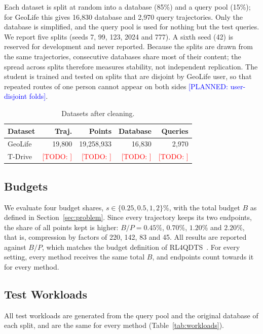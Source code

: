\documentclass[conference]{IEEEtran}
\newcommand{\todo}[1]{\textcolor{red}{[TODO: #1]}}
\newcommand{\planned}[1]{\textcolor{blue}{[PLANNED: #1]}}
\begin{document}
Each dataset is split at random into a database (85\%) and a query pool (15\%); for GeoLife this
gives 16{,}830 database and 2{,}970 query trajectories. Only the database is simplified, and
the query pool is used for nothing but the test queries. We report five splits (seeds 7, 99, 123,
2024 and 777). A sixth seed (42) is reserved for development and never reported. Because the
splits are drawn from the same trajectories, consecutive databases share most of their content;
the spread across splits therefore measures stability, not independent replication. The student is
trained and tested on splits that are disjoint by GeoLife user, so that repeated routes of one
person cannot appear on both sides \planned{user-disjoint folds}.

\begin{table}[t]
\centering
\caption{Datasets after cleaning.}
\label{tab:datasets}
\small
\begin{tabular}{@{}lrrrr@{}}
\toprule
Dataset & Traj. & Points & Database & Queries \\
\midrule
GeoLife & 19{,}800 & 19{,}258{,}933 & 16{,}830 & 2{,}970 \\
T-Drive & \todo{} & \todo{} & \todo{} & \todo{} \\
\bottomrule
\end{tabular}
\end{table}

\subsection{Budgets}
\label{sec:budgets}

We evaluate four budget shares, $s \in \{0.25, 0.5, 1, 2\}\%$, with the total budget $B$ as defined
in Section~\ref{sec:problem}. Since every trajectory keeps its two endpoints, the share of all
points kept is higher: $B/P = 0.45\%$, $0.70\%$, $1.20\%$ and $2.20\%$, that is, compression by
factors of 220, 142, 83 and 45. All results are reported against $B/P$, which matches the budget
definition of RL4QDTS~\cite{rl4qdts}. For every setting, every method receives the same total $B$,
and endpoints count towards it for every method.

\subsection{Test Workloads}
\label{sec:parameters}

All test workloads are generated from the query pool and the original database of each split, and
are the same for every method (Table~\ref{tab:workloads}).
\end{document}
